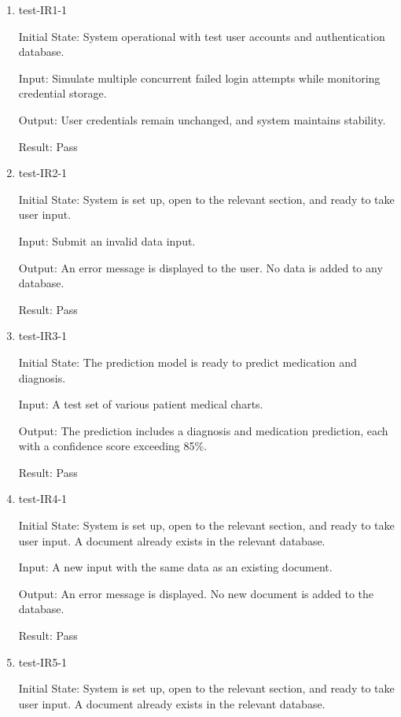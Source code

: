 \documentclass[12pt, titlepage]{article}
\begin{document}
\begin{enumerate}

  \item test-IR1-1 \label{test-IR1-1}

  Initial State: System operational with test user accounts and authentication database.

  Input: Simulate multiple concurrent failed login attempts while monitoring credential storage.


  Output: User credentials remain unchanged, and system maintains stability.

  Result: Pass

  \item test-IR2-1 \label{test-IR2-1}

  Initial State: System is set up, open to the relevant section, and ready to take user input.

  Input: Submit an invalid data input.

  Output: An error message is displayed to the user. No data is added to any database.

  Result: Pass

  \item test-IR3-1 \label{test-IR3-1}

  Initial State: The prediction model is ready to predict medication and diagnosis.

  Input: A test set of various patient medical charts.

  Output: The prediction includes a diagnosis and medication prediction, each with a confidence score exceeding 85\%.

  Result: Pass

  \item test-IR4-1 \label{test-IR4-1}

  Initial State: System is set up, open to the relevant section, and ready to take user input. A document already exists in the relevant database.

  Input: A new input with the same data as an existing document.

  Output: An error message is displayed. No new document is added to the database.

  Result: Pass

  \item test-IR5-1 \label{test-IR6-1} 
  
  Initial State: System is set up, open to the relevant section, and ready to take user input. A document already exists in the relevant database.


\end{enumerate}
\end{document}
